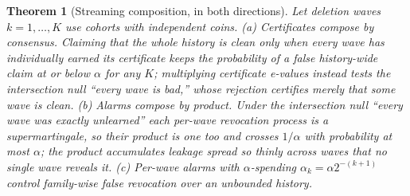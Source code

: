 \documentclass[pdflatex,sn-mathphys-num]{sn-jnl}
\theoremstyle{thmstyleone}
\newtheorem{theorem}{Theorem}
\theoremstyle{thmstyletwo}
\theoremstyle{thmstylethree}
\begin{document}
\begin{theorem}[Streaming composition, in both directions]\label{thm:streaming}
Let deletion waves $k = 1,\dots,K$ use cohorts with independent coins.
\emph{(a) Certificates compose by consensus.} Claiming that the whole history is clean
only when every wave has individually earned its certificate keeps the probability of a
false history-wide claim at or below $\alpha$ for any $K$; multiplying certificate
e-values instead tests the intersection null ``every wave is bad,'' whose rejection
certifies merely that \emph{some} wave is clean.
\emph{(b) Alarms compose by product.} Under the intersection null ``every wave was
exactly unlearned'' each per-wave revocation process is a supermartingale, so their
product is one too and crosses $1/\alpha$ with probability at most $\alpha$; the product
accumulates leakage spread so thinly across waves that no single wave reveals it.
\emph{(c)} Per-wave alarms with $\alpha$-spending $\alpha_k = \alpha 2^{-(k+1)}$ control
family-wise false revocation over an unbounded history.
\end{theorem}
\end{document}
